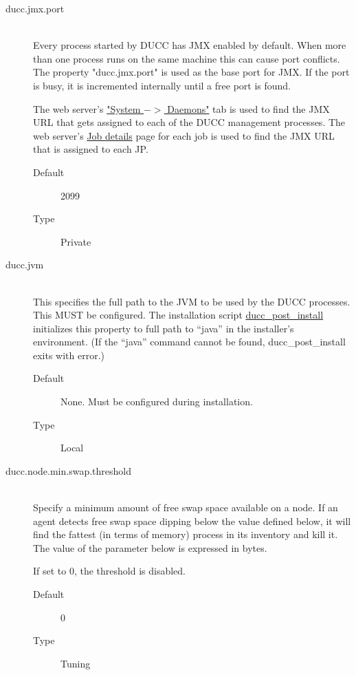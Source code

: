 \begin{description}
       \item[ducc.jmx.port] \hfill \\
         Every process started by DUCC has JMX enabled by default. When more than one process 
         runs on the same machine this can cause port conflicts. The property "ducc.jmx.port" is 
         used as the base port for JMX. If the port is busy, it is incremented internally until a free 
         port is found. 
         
         The web server's \hyperref[sec:system-details.daemons]{"System $->$ Daemons"} tab is used
         to find the JMX URL that gets assigned to each of the DUCC management processes. The web
         server's \hyperref[sec:ws-job-details]{Job details} page for each job is used to find the
         JMX URL that is assigned to each JP.
         
         \begin{description}
           \item[Default] 2099 
           \item[Type] Private 
         \end{description}

       \item[ducc.jvm] \hfill \\
         This specifies the full path to the JVM to be used by the DUCC processes. This MUST be
         configured.  The installation script
         \hyperref[subsec:install.single-user]{ducc\_post\_install} initializes this property to 
         full path to ``java'' in the installer's environment.  (If the ``java'' command cannot
         be found, ducc\_post\_install exits with error.)
         \begin{description}
           \item[Default] None.  Must be configured during installation.
           \item[Type] Local 
         \end{description}

       \item[ducc.node.min.swap.threshold] \hfill \\
         Specify a minimum amount of free swap space available on a node.
         If an agent detects free swap space dipping below the value defined
         below, it will find the fattest (in terms of memory) process in its
         inventory and kill it. The value of the parameter below is expressed
         in bytes.

         If set to 0, the threshold is disabled.
         \begin{description}
           \item[Default] 0
           \item[Type] Tuning
         \end{description}



\end{description}
